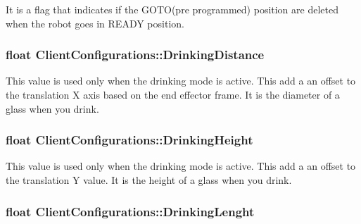 It is a flag that indicates if the G\+O\+T\+O(pre programmed) position are deleted when the robot goes in R\+E\+A\+DY position. 

\subsubsection[{\texorpdfstring{Drinking\+Distance}{DrinkingDistance}}]{\setlength{\rightskip}{0pt plus 5cm}float Client\+Configurations\+::\+Drinking\+Distance}\hypertarget{struct_client_configurations_a494c5a866ae44191aafdc66ab69033c3}{}\label{struct_client_configurations_a494c5a866ae44191aafdc66ab69033c3}


This value is used only when the drinking mode is active. This add a an offset to the translation X axis based on the end effector frame. It is the diameter of a glass when you drink. 

\subsubsection[{\texorpdfstring{Drinking\+Height}{DrinkingHeight}}]{\setlength{\rightskip}{0pt plus 5cm}float Client\+Configurations\+::\+Drinking\+Height}\hypertarget{struct_client_configurations_a05043c8fe2f31f3c216a97edc2411664}{}\label{struct_client_configurations_a05043c8fe2f31f3c216a97edc2411664}


This value is used only when the drinking mode is active. This add a an offset to the translation Y value. It is the height of a glass when you drink. 

\subsubsection[{\texorpdfstring{Drinking\+Lenght}{DrinkingLenght}}]{\setlength{\rightskip}{0pt plus 5cm}float Client\+Configurations\+::\+Drinking\+Lenght}\hypertarget{struct_client_configurations_a1029013b8d5d2d9ea902ab628c98a7e0}{}\label{struct_client_configurations_a1029013b8d5d2d9ea902ab628c98a7e0}


